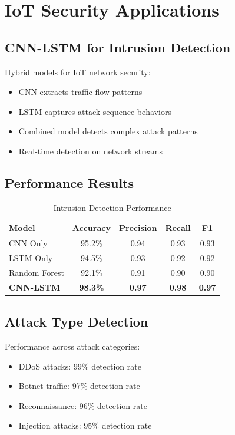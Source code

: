 \documentclass[12pt,a4paper]{article}
\begin{document}
\section{IoT Security Applications}

\subsection{CNN-LSTM for Intrusion Detection}

Hybrid models for IoT network security:
\begin{itemize}
    \item CNN extracts traffic flow patterns
    \item LSTM captures attack sequence behaviors
    \item Combined model detects complex attack patterns
    \item Real-time detection on network streams
\end{itemize}

\subsection{Performance Results}

\begin{table}[H]
\centering
\caption{Intrusion Detection Performance}
\begin{tabular}{lcccc}
\toprule
\textbf{Model} & \textbf{Accuracy} & \textbf{Precision} & \textbf{Recall} & \textbf{F1} \\
\midrule
CNN Only & 95.2\% & 0.94 & 0.93 & 0.93 \\
LSTM Only & 94.5\% & 0.93 & 0.92 & 0.92 \\
Random Forest & 92.1\% & 0.91 & 0.90 & 0.90 \\
\textbf{CNN-LSTM} & \textbf{98.3\%} & \textbf{0.97} & \textbf{0.98} & \textbf{0.97} \\
\bottomrule
\end{tabular}
\end{table}

\subsection{Attack Type Detection}

Performance across attack categories:
\begin{itemize}
    \item DDoS attacks: 99\% detection rate
    \item Botnet traffic: 97\% detection rate
    \item Reconnaissance: 96\% detection rate
    \item Injection attacks: 95\% detection rate
\end{itemize}
\end{document}
